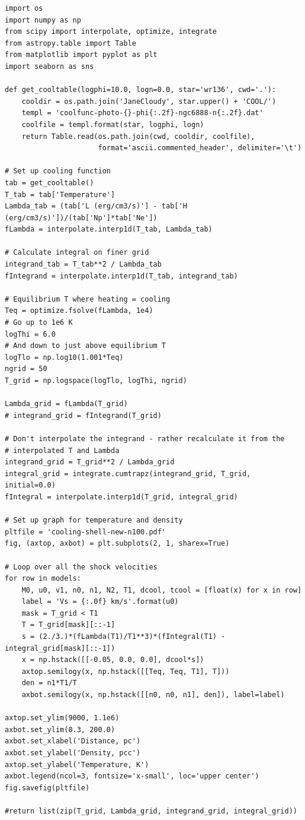 \documentclass[11pt]{article}
\begin{document}
\begin{verbatim}
import os
import numpy as np
from scipy import interpolate, optimize, integrate
from astropy.table import Table
from matplotlib import pyplot as plt
import seaborn as sns

def get_cooltable(logphi=10.0, logn=0.0, star='wr136', cwd='.'):
    cooldir = os.path.join('JaneCloudy', star.upper() + 'COOL/')
    templ = 'coolfunc-photo-{}-phi{:.2f}-ngc6888-n{:.2f}.dat'
    coolfile = templ.format(star, logphi, logn)
    return Table.read(os.path.join(cwd, cooldir, coolfile),
                      format='ascii.commented_header', delimiter='\t')

# Set up cooling function
tab = get_cooltable()
T_tab = tab['Temperature']
Lambda_tab = (tab['L (erg/cm3/s)'] - tab['H (erg/cm3/s)'])/(tab['Np']*tab['Ne'])
fLambda = interpolate.interp1d(T_tab, Lambda_tab)

# Calculate integral on finer grid
integrand_tab = T_tab**2 / Lambda_tab
fIntegrand = interpolate.interp1d(T_tab, integrand_tab)

# Equilibrium T where heating = cooling
Teq = optimize.fsolve(fLambda, 1e4)
# Go up to 1e6 K
logThi = 6.0
# And down to just above equilibrium T
logTlo = np.log10(1.001*Teq)
ngrid = 50
T_grid = np.logspace(logTlo, logThi, ngrid)

Lambda_grid = fLambda(T_grid)
# integrand_grid = fIntegrand(T_grid)

# Don't interpolate the integrand - rather recalculate it from the
# interpolated T and Lambda
integrand_grid = T_grid**2 / Lambda_grid
integral_grid = integrate.cumtrapz(integrand_grid, T_grid, initial=0.0)
fIntegral = interpolate.interp1d(T_grid, integral_grid)

# Set up graph for temperature and density
pltfile = 'cooling-shell-new-n100.pdf'
fig, (axtop, axbot) = plt.subplots(2, 1, sharex=True)

# Loop over all the shock velocities
for row in models:
    M0, u0, v1, n0, n1, N2, T1, dcool, tcool = [float(x) for x in row]
    label = 'Vs = {:.0f} km/s'.format(u0)
    mask = T_grid < T1
    T = T_grid[mask][::-1]
    s = (2./3.)*(fLambda(T1)/T1**3)*(fIntegral(T1) - integral_grid[mask][::-1])
    x = np.hstack([[-0.05, 0.0, 0.0], dcool*s]) 
    axtop.semilogy(x, np.hstack([[Teq, Teq, T1], T]))
    den = n1*T1/T
    axbot.semilogy(x, np.hstack([[n0, n0, n1], den]), label=label)

axtop.set_ylim(9000, 1.1e6)
axbot.set_ylim(0.3, 200.0)
axbot.set_xlabel('Distance, pc')
axbot.set_ylabel('Density, pcc')
axtop.set_ylabel('Temperature, K')
axbot.legend(ncol=3, fontsize='x-small', loc='upper center')
fig.savefig(pltfile)

#return list(zip(T_grid, Lambda_grid, integrand_grid, integral_grid))
\end{verbatim}
\end{document}
